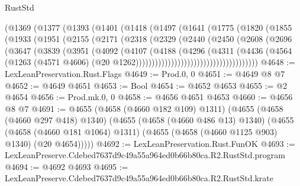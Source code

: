 \begin{lexlean}{RustStd}
\begin{coremodule}
                (@1369
                  (@1377
                    (@1393
                      (@1401
                        (@1418
                          (@1497
                            (@1641
                              (@1775
                                (@1820
                                  (@1855
                                    (@1933
                                      (@1951
                                        (@2155
                                          (@2171
                                            (@2318
                                              (@2329
                                                (@2440
                                                  (@2450
                                                    (@2608
                                                      (@2696
                                                        (@3647
                                                          (@3839
                                                            (@3951
                                                              (@4092
                                                                (@4107
                                                                  (@4188
                                                                    (@4296
                                                                      (@4311
                                                                        (@4436
                                                                          (@4564
                                                                            (@1263
                                                                              (@4571 @4606)
                                                                              (@20
                                                                                @1262))))))))))))))))))))))))))))))))))))))
@4648 := LexLeanPreservation.Rust.Flags
@4649 := Prod.{0, 0}
@4651 := @4649 @8 @7
@4652 := @4649 @4651
@4653 := Bool
@4654 := @4652 @4653
@4655 := @2 @4654
@4656 := Prod.mk.{0, 0}
@4658 := @4656 @4651 @4653
@4660 := @4656 @8 @7
@4691 := @4655
    (@4658 (@4660 @182 @109) @1311)
    (@4655
      (@4658 (@4660 @297 @418) @1340)
      (@4655
        (@4658 (@4660 @486 @13) @1340)
        (@4655
          (@4658 (@4660 @181 @1064) @1311)
          (@4655 (@4658 (@4660 @1125 @903) @1340) (@20 @4654)))))
@4692 := LexLeanPreservation.Rust.FunOK
@4693 := LexLeanPreserve.Cdebed7637d9c49a55a964ed0b66b80ca.R2.RustStd.program
@4694 := @4692 @4693
@4695 := LexLeanPreserve.Cdebed7637d9c49a55a964ed0b66b80ca.R2.RustStd.krate

\end{coremodule}
\end{lexlean}
